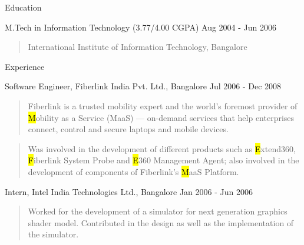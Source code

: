 \documentclass{resume}
\author{Ashish Tulsian}
\begin{document}
 \maketitle

\begin{category}{Education}{}

    \item {\topic M.Tech in Information Technology}
        {\footnotesize(3.77/4.00 CGPA)}
        {\period Aug 2004 - Jun 2006}
        \begin{quote}
            International Institute of Information Technology, Bangalore
        \end{quote}

\end{category}


\begin{category}{Experience}{}

    \item {\topic Software Engineer,} Fiberlink India Pvt. Ltd., Bangalore
        {\period Jul 2006 - Dec 2008}
        \begin{quote}
            Fiberlink is a trusted mobility expert and the world's foremost
            provider of {\hl Mobility as a Service} (MaaS) --- on-demand
            services that help enterprises connect, control and secure laptops
            and mobile devices.
        \end{quote}
        \begin{quote}
            Was involved in the development of different products such as {\hl
            Extend360}, {\hl Fiberlink System Probe} and {\hl E360 Management
            Agent}; also involved in the development of components of
            Fiberlink's {\hl MaaS Platform}.
        \end{quote}

    \item {\topic Intern,} Intel India Technologies Ltd., Bangalore
        {\period Jan 2006 - Jun 2006}
        \begin{quote}
            Worked for the development of a simulator for next generation
            graphics shader model. Contributed in the design as well as the
            implementation of the simulator.
        \end{quote}

\end{category}
\end{document}
